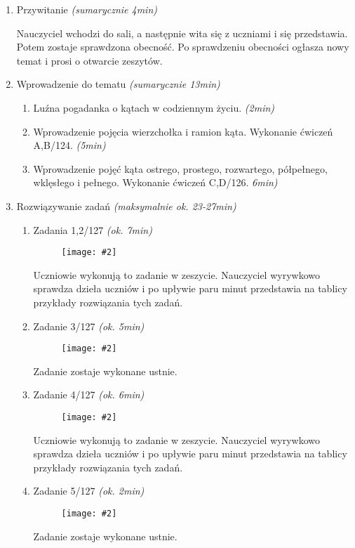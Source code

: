 \documentclass[a5paper,10pt,bibliography=totoc]{article}
\newcommand{\zadanie}[4]{%
	#1 \textit{(ok. #3min)}%
	\begin{figure}[h!]%
		\centering%
  		\texttt{[image: \#2]}%
	\end{figure}%
}
\begin{document}
\begin{enumerate} %
	\item Przywitanie \textit{(sumarycznie 4min)}
	
Nauczyciel wchodzi do sali, a następnie wita się z uczniami i się przedstawia. Potem zostaje sprawdzona obecność. Po sprawdzeniu obecności ogłasza nowy temat i prosi o otwarcie zeszytów. 

	\item Wprowadzenie do tematu \textit{(sumarycznie 13min)}
	\begin{enumerate}[label=\alph*)]
		\item Luźna pogadanka o kątach w codziennym życiu. \textit{(2min)}
		\item Wprowadzenie pojęcia wierzchołka i ramion kąta. Wykonanie ćwiczeń A,B/124. \textit{(5min)}
		\item Wprowadzenie pojęć kąta ostrego, prostego, rozwartego, półpełnego, wklęsłego i pełnego. Wykonanie ćwiczeń C,D/126. \textit{6min)}
	\end{enumerate}
	
    \item Rozwiązywanie zadań \textit{(maksymalnie ok. 23-27min)} 
	\begin{enumerate}[label=\alph*)]
		\item \zadanie{Zadania 1,2/127}{1,2-127.png}{7}{3in}
		
		Uczniowie wykonują to zadanie w zeszycie. Nauczyciel wyrywkowo sprawdza dzieła uczniów i po upływie paru minut przedstawia na tablicy przykłady rozwiązania tych zadań.
		\newline

		\item \zadanie{Zadanie 3/127}{3-127.png}{5}{3in}
		
		Zadanie zostaje wykonane ustnie.
		\newline
		
		\item \zadanie{Zadanie 4/127}{4-127.png}{6}{2in}
		
		Uczniowie wykonują to zadanie w zeszycie. Nauczyciel wyrywkowo sprawdza dzieła uczniów i po upływie paru minut przedstawia na tablicy przykłady rozwiązania tych zadań.
		\newline\newpage
		
		\item \zadanie{Zadanie 5/127}{5-127.png}{2}{2in} \nopagebreak[4]
		
		Zadanie zostaje wykonane ustnie.
		\newline
		

\end{enumerate}
\end{enumerate}
\end{document}
